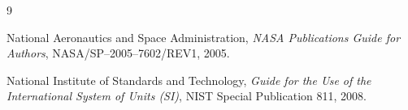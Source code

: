 \begin{thebibliography}{9}
National Aeronautics and Space Administration,
\emph{NASA Publications Guide for Authors}, NASA/SP--2005--7602/REV1, 2005.

National Institute of Standards and Technology,
\emph{Guide for the Use of the International System of Units (SI)},
NIST Special Publication 811, 2008.
\end{thebibliography}

